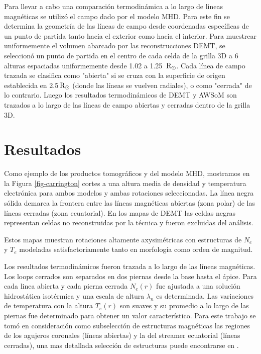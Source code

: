 \documentclass[baaa]{baaa}
\begin{document}
Para llevar a cabo una comparación termodinámica a lo largo de lineas magnéticas se utilizó el campo dado por el modelo MHD. Para este fin se determina la geometría de las líneas de campo desde coordenadas específicas de un punto de partida tanto hacia el exterior como hacia el interior. Para muestrear uniformemente el volumen abarcado por las reconstrucciones DEMT, se seleccionó un punto de partida en el centro de cada celda de la grilla 3D a 6 alturas espaciadas uniformemente desde 1.02 a 1.25 $\,{\rm R_\odot}$. Cada línea de campo trazada se clasifica como "abierta" si se cruza con la superficie de origen establecida en 2.5$\,{\rm R_\odot}$ (donde las líneas se vuelven radiales), o como "cerrada" de lo contrario. Luego los resultados termodinámicos de DEMT y AWSoM son trazados a lo largo de las líneas de campo abiertas y cerradas dentro de la grilla 3D. 





\section{Resultados}
Como ejemplo de los productos tomográficos y del modelo MHD, mostramos en la Figura \ref{fig-carrington} cortes a una altura media de densidad y temperatura electrónica para ambos modelos y ambas rotaciones seleccionadas. La línea negra sólida demarca la frontera entre las líneas magnéticas abiertas (zona polar) de las líneas cerradas (zona ecuatorial). En los mapas de DEMT las celdas negras representan celdas no reconstruidas por la técnica y fueron excluidas del análisis.

Estos mapas muestran rotaciones altamente axysimétricas con estructuras de $N_e$ y $T_e$ modeladas satisfactoriamente tanto en morfología como orden de magnitud.

Los resultados termodinámicos fueron trazada a lo largo de las líneas magnéticas. Los loops cerrados son separados en dos piernas desde la base hasta el ápice. Para cada linea abierta y cada pierna cerrada $N_e(r)$ fue ajustada a una solución hidrostática isotérmica y una escala de altura $\lambda_n$ es determinada. Las variaciones de temperatura con la altura $T_e(r)$ son suaves y su promedio a lo largo de las piernas fue determinado para obtener un valor característico. Para este trabajo se tomó en consideración como subselección de estructuras magnéticas las regiones de los agujeros coronales (líneas abiertas) y la del streamer ecuatorial (líneas cerradas), una mas detallada selección de estructuras puede encontrarse en \citet{lloveras_2017}. 
\end{document}
